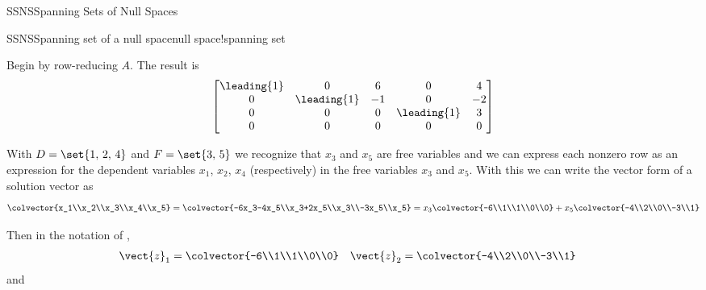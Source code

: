 \begin{subsect}{SSNS}{Spanning Sets of Null Spaces}
\begin{example}{SSNS}{Spanning set of a null space}{null space!spanning set}
%
\begin{para}Begin by row-reducing $A$.  The result is
%
\begin{equation*}
\begin{bmatrix}
\leading{1} & 0 & 6 & 0 & 4\\
0 & \leading{1} & -1 & 0 & -2\\
0 & 0 & 0 & \leading{1} & 3\\
0 & 0 & 0 & 0 & 0
\end{bmatrix}
\end{equation*}
\end{para}
%
\begin{para}With $D=\set{1,\,2,\,4}$ and $F=\set{3,\,5}$ we recognize that $x_3$ and $x_5$ are free variables and we can express each nonzero row as an expression for the dependent variables $x_1$, $x_2$, $x_4$ (respectively) in the free variables $x_3$ and $x_5$.  With this we can write the vector form of a solution vector as
%
\begin{equation*}
\colvector{x_1\\x_2\\x_3\\x_4\\x_5}=
\colvector{-6x_3-4x_5\\x_3+2x_5\\x_3\\-3x_5\\x_5}=
x_3\colvector{-6\\1\\1\\0\\0}+
x_5\colvector{-4\\2\\0\\-3\\1}
\end{equation*}
\end{para}
%
\begin{para}Then in the notation of ,
%
\begin{align*}
\vect{z}_1&=\colvector{-6\\1\\1\\0\\0}&
\vect{z}_2&=\colvector{-4\\2\\0\\-3\\1}
\end{align*}
%
and
%
\begin{equation*}

\end{equation*}
\end{para}
\end{example}
\end{subsect}
